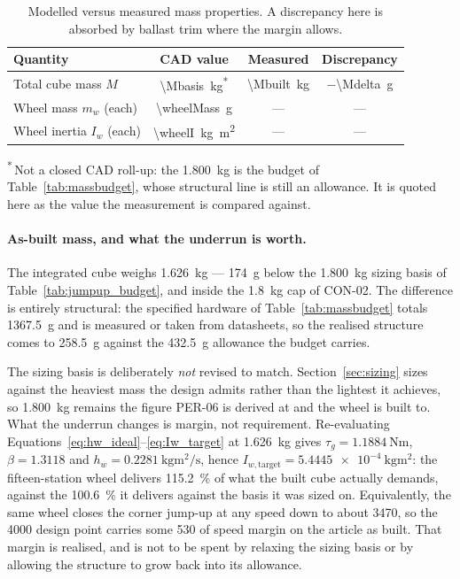 \begin{table}[htbp]
\centering
\caption[Modelled versus measured mass properties]{Modelled versus measured mass properties. A discrepancy here is
absorbed by ballast trim where the margin allows.}
\label{tab:mass_verification}
\small
\begin{tabular}{L{4.6cm} c c c}
\toprule
Quantity & CAD value & Measured & Discrepancy \\
\midrule
Total cube mass $M$          & \qty{\Mbasis}{\kilo\gram}\textsuperscript{*} & \qty{\Mbuilt}{\kilo\gram} & $-$\qty{\Mdelta}{\gram} \\
Wheel mass $m_w$ (each)      & \qty{\wheelMass}{\gram} & --- & --- \\
Wheel inertia $I_w$ (each)   & \qty{\wheelI}{\kilogram\metre\squared} & --- & --- \\
\bottomrule
\end{tabular}

\vspace{0.4em}
{\footnotesize\RaggedRight\textsuperscript{*}\,Not a closed CAD roll-up: the
\qty{1.800}{\kilo\gram} is the budget of Table~\ref{tab:massbudget}, whose
structural line is still an allowance. It is quoted here as the value the
measurement is compared against.\par}
\end{table}

\paragraph{As-built mass, and what the underrun is worth.} The integrated cube
weighs \qty{1.626}{\kilo\gram} --- \qty{174}{\gram} below the
\qty{1.800}{\kilo\gram} sizing basis of Table~\ref{tab:jumpup_budget}, and
inside the \qty{1.8}{\kilo\gram} cap of CON-02. The difference is entirely
structural: the specified hardware of Table~\ref{tab:massbudget} totals
\qty{1367.5}{\gram} and is measured or taken from datasheets, so the realised
structure comes to \qty{258.5}{\gram} against the \qty{432.5}{\gram} allowance
the budget carries.

The sizing basis is deliberately \emph{not} revised to match.
Section~\ref{sec:sizing} sizes against the heaviest mass the design admits
rather than the lightest it achieves, so \qty{1.800}{\kilo\gram} remains the
figure PER-06 is derived at and the wheel is built to. What the underrun
changes is margin, not requirement. Re-evaluating
Equations~\eqref{eq:hw_ideal}--\eqref{eq:Iw_target} at \qty{1.626}{\kilo\gram}
gives $\tau_g = \qty{1.1884}{\newton\metre}$, $\beta = \num{1.3118}$ and $h_w
= \qty{0.2281}{\kilo\gram\metre\squared\per\second}$, hence
$I_{w,\text{target}} = \qty{5.4445e-4}{\kilogram\metre\squared}$: the
fifteen-station wheel delivers \qty{115.2}{\percent} of what the built cube
actually demands, against the \qty{100.6}{\percent} it delivers against the
basis it was sized on. Equivalently, the same wheel closes the corner jump-up
at any speed down to about \qty{3470}{\rpm}, so the \qty{4000}{\rpm} design
point carries some \qty{530}{\rpm} of speed margin on the article as built.
That margin is realised, and is not to be spent by relaxing the sizing basis
or by allowing the structure to grow back into its allowance.
